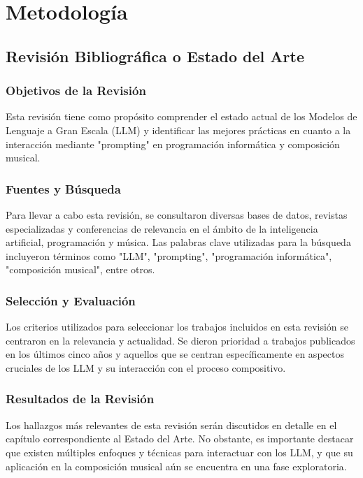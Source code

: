 \chapter{Metodología}

\section{Revisión Bibliográfica o Estado del Arte}

\subsection{Objetivos de la Revisión}
Esta revisión tiene como propósito comprender el estado actual de los Modelos de Lenguaje a Gran Escala (LLM) y identificar las mejores prácticas en cuanto a la interacción mediante "prompting" en programación informática y composición musical.

\subsection{Fuentes y Búsqueda}
Para llevar a cabo esta revisión, se consultaron diversas bases de datos, revistas especializadas y conferencias de relevancia en el ámbito de la inteligencia artificial, programación y música. Las palabras clave utilizadas para la búsqueda incluyeron términos como "LLM", "prompting", "programación informática", "composición musical", entre otros.

\subsection{Selección y Evaluación}
Los criterios utilizados para seleccionar los trabajos incluidos en esta revisión se centraron en la relevancia y actualidad. Se dieron prioridad a trabajos publicados en los últimos cinco años y aquellos que se centran específicamente en aspectos cruciales de los LLM y su interacción con el proceso compositivo.

\subsection{Resultados de la Revisión}
Los hallazgos más relevantes de esta revisión serán discutidos en detalle en el capítulo correspondiente al Estado del Arte. No obstante, es importante destacar que existen múltiples enfoques y técnicas para interactuar con los LLM, y que su aplicación en la composición musical aún se encuentra en una fase exploratoria.

